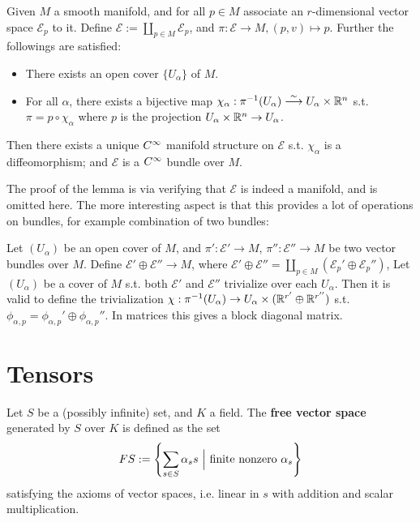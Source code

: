 \documentclass{article}
\begin{document}
\begin{lemma}
    Given $M$ a smooth manifold, and for all $p \in M$ associate an $r$-dimensional vector space $\mathcal{E}_p$ to it. Define $\mathcal{E} := \coprod_{p \in M} \mathcal{E}_p$, and $\pi: \mathcal{E} \to M, (p, v) \mapsto p$. Further the followings are satisfied:
    \begin{itemize}
        \item There exists an open cover $\{U_{\alpha}\}$ of $M$.
        \item For all $\alpha$, there exists a bijective map $\chi_{\alpha}: \pi^{-1}(U_{\alpha}) \overset{\sim}{\longrightarrow} U_{\alpha} \times \mathbb{R}^n$ s.t. $\pi = p \circ \chi_{\alpha}$ where $p$ is the projection $U_{\alpha} \times \mathbb{R}^n \to U_{\alpha}$.
    \end{itemize}
    Then there exists a unique $C^{\infty}$ manifold structure on $\mathcal{E}$ s.t. $\chi_{\alpha}$ is a diffeomorphism; and $\mathcal{E}$ is a $C^{\infty}$ bundle over $M$. 
\end{lemma}

The proof of the lemma is via verifying that $\mathcal{E}$ is indeed a manifold, and is omitted here. The more interesting aspect is that this provides a lot of operations on bundles, for example combination of two bundles:

\begin{example}\label{ex: direct sum of vector bundle}

    Let $(U_{\alpha})$ be an open cover of $M$, and $\pi': \mathcal{E}' \to M$, $\pi'': \mathcal{E}'' \to M$ be two vector bundles over $M$. Define $\mathcal{E}' \oplus \mathcal{E}'' \to M$, where $\mathcal{E}' \oplus \mathcal{E}'' = \coprod_{p \in M} (\mathcal{E}_p' \oplus \mathcal{E}_p'')$, Let $(U_{\alpha})$ be a cover of $M$ s.t. both $\mathcal{E}'$ and $\mathcal{E}''$ trivialize over each $U_{\alpha}$. Then it is valid to define the trivialization $\chi: \pi^{-1}(U_{\alpha}) \to U_{\alpha} \times (\mathbb{R}^{r'} \oplus \mathbb{R}^{r''})$ s.t. $\phi_{\alpha, p} = \phi_{\alpha, p}' \oplus \phi_{\alpha, p}''$. In matrices this gives a block diagonal matrix. 
\end{example}

\section{Tensors}

\begin{definition}
    Let $S$ be a (possibly infinite) set, and $K$ a field. The \textbf{free vector space} generated by $S$ over $K$ is defined as the set
    \[
        FS := \left\{ \sum_{s \in S} \alpha_s s \ \Big|\  \text{finite nonzero } \alpha_s \right\}
    \]
    satisfying the axioms of vector spaces, i.e. linear in $s$ with addition and scalar multiplication.
\end{definition}
\end{document}
